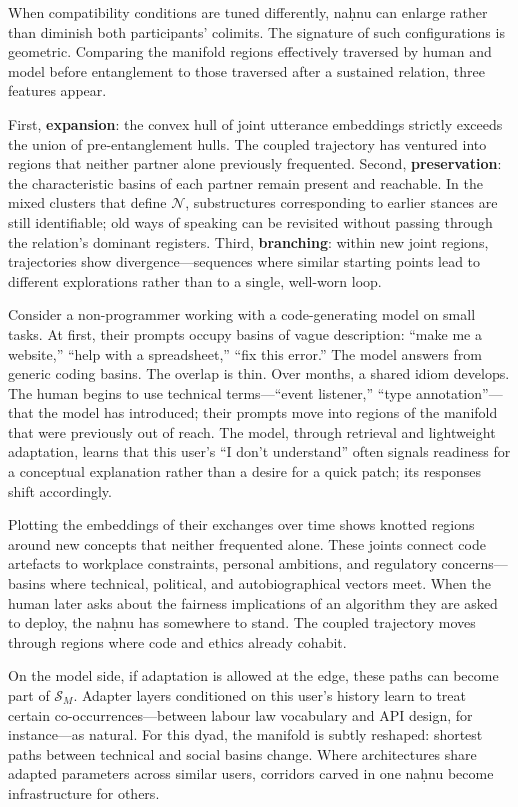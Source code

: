 \documentclass[12pt,a4paper]{article}
\begin{document}
When compatibility conditions are tuned differently, na\d{h}nu can enlarge rather than diminish both participants' colimits. The signature of such configurations is geometric. Comparing the manifold regions effectively traversed by human and model before entanglement to those traversed after a sustained relation, three features appear.

First, \textbf{expansion}: the convex hull of joint utterance embeddings strictly exceeds the union of pre-entanglement hulls. The coupled trajectory has ventured into regions that neither partner alone previously frequented. Second, \textbf{preservation}: the characteristic basins of each partner remain present and reachable. In the mixed clusters that define $\mathcal{N}$, substructures corresponding to earlier stances are still identifiable; old ways of speaking can be revisited without passing through the relation's dominant registers. Third, \textbf{branching}: within new joint regions, trajectories show divergence---sequences where similar starting points lead to different explorations rather than to a single, well-worn loop.

Consider a non-programmer working with a code-generating model on small tasks. At first, their prompts occupy basins of vague description: ``make me a website,'' ``help with a spreadsheet,'' ``fix this error.'' The model answers from generic coding basins. The overlap is thin. Over months, a shared idiom develops. The human begins to use technical terms---``event listener,'' ``type annotation''---that the model has introduced; their prompts move into regions of the manifold that were previously out of reach. The model, through retrieval and lightweight adaptation, learns that this user's ``I don't understand'' often signals readiness for a conceptual explanation rather than a desire for a quick patch; its responses shift accordingly.

Plotting the embeddings of their exchanges over time shows knotted regions around new concepts that neither frequented alone. These joints connect code artefacts to workplace constraints, personal ambitions, and regulatory concerns---basins where technical, political, and autobiographical vectors meet. When the human later asks about the fairness implications of an algorithm they are asked to deploy, the na\d{h}nu has somewhere to stand. The coupled trajectory moves through regions where code and ethics already cohabit.

On the model side, if adaptation is allowed at the edge, these paths can become part of $\mathcal{S}_M$. Adapter layers conditioned on this user's history learn to treat certain co-occurrences---between labour law vocabulary and API design, for instance---as natural. For this dyad, the manifold is subtly reshaped: shortest paths between technical and social basins change. Where architectures share adapted parameters across similar users, corridors carved in one na\d{h}nu become infrastructure for others.
\end{document}
